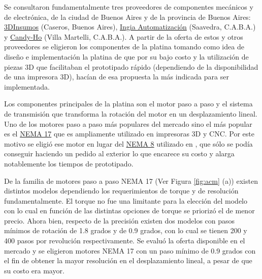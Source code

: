 Se consultaron fundamentalmente tres proveedores de componentes mecánicos y de electrónica, de la ciudad de Buenos Aires y de la provincia de Buenos Aires: \href{https://3dinsumos.com.ar/}{3DInsumos} (Caseros, Buenos Aires), \href{https://ingia.com.ar/}{Ingia Automatización} (Saavedra, C.A.B.A.) y \href{https://candy-ho.com/}{Candy-Ho} (Villa Martelli, C.A.B.A.). A partir de la oferta de estos y otros proveedores se eligieron los componentes de la platina tomando como idea de diseño e implementación la platina de \cite{schaa} que por su bajo costo y la utilización de piezas 3D que facilitaban el prototipado rápido (dependiendo de la disponibilidad de una impresora 3D), hacían de esa propuesta la más indicada para ser implementada.

Los componentes principales de la platina son el motor paso a paso y el sistema de transmisión que transforma la rotación del motor en un desplazamiento lineal. Uno de los motores paso a paso más populares del mercado sino el más popular es el \href{https://www.pololu.com/product/1200}{NEMA 17} que es ampliamente utilizado en impresoras 3D y CNC. Por este motivo se eligió ese motor en lugar del \href{https://www.pololu.com/product/1204}{NEMA 8} utilizado en \cite{schaa}, que sólo se podía conseguir haciendo un pedido al exterior lo que encarece su costo y alarga notablemente los tiempos de prototipado.

De la familia de motores paso a paso NEMA 17 (Ver Figura \ref{fig:acm} (a)) existen distintos modelos dependiendo los requerimientos de torque y de resolución fundamentalmente. El torque no fue una limitante para la elección del modelo con lo cual en función de las distintas opciones de torque se priorizó el de menor precio. Ahora bien, respecto de la precisión existen dos modelos con pasos mínimos de rotación de 1.8 grados y de 0.9 grados, con lo cual se tienen 200 y 400 pasos por revolución respectivamente. Se evaluó la oferta disponible en el mercado y se eligieron motores NEMA 17 con un paso mínimo de 0.9 grados con el fin de obtener la mayor resolución en el desplazamiento lineal, a pesar de que su costo era mayor.

